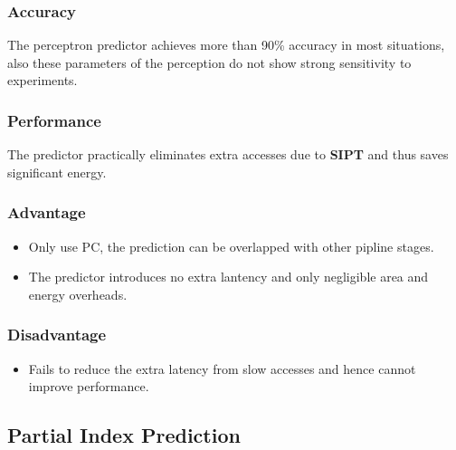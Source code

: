 \documentclass[10pt,a4paper]{article}
\begin{document}
\subsubsection{Accuracy}
The perceptron predictor achieves more than 90\% accuracy in most situations, also these parameters of the perception do not show strong sensitivity to experiments.
\subsubsection{Performance}
The predictor practically eliminates extra accesses due to \textbf{SIPT} and thus saves significant energy.
\subsubsection{Advantage}
\begin{itemize}
    \item Only use PC, the prediction can be overlapped with other pipline stages. 
    \item The predictor introduces no extra lantency and only negligible area and energy overheads.
\end{itemize}
\subsubsection{Disadvantage}
\begin{itemize}
    \item Fails to reduce the extra latency from slow accesses and hence cannot improve performance.
\end{itemize}

\subsection{Partial Index Prediction}
\end{document}
